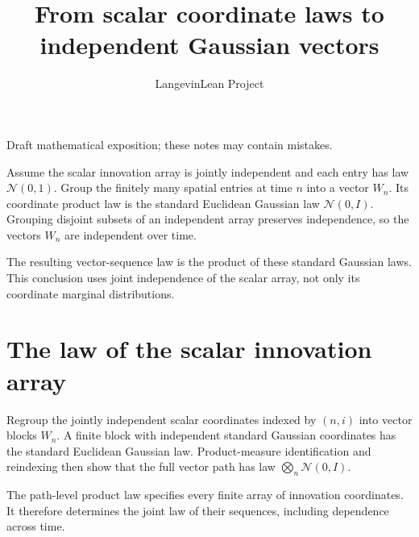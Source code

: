 \documentclass[11pt,a4paper]{article}
\title{\texorpdfstring{From scalar coordinate laws to independent Gaussian vectors}{From scalar coordinate laws to independent Gaussian vectors}}
\author{LangevinLean Project}
\date{}
\begin{document}
\maketitle
Draft mathematical exposition; these notes may contain mistakes.


Assume the scalar innovation array is jointly independent and each entry has law \(\mathcal N(0,1)\). Group the finitely many spatial entries at time \(n\) into a vector \(W_n\). Its coordinate product law is the standard Euclidean Gaussian law \(\mathcal N(0,I)\). Grouping disjoint subsets of an independent array preserves independence, so the vectors \(W_n\) are independent over time.



The resulting vector-sequence law is the product of these standard Gaussian laws. This conclusion uses joint independence of the scalar array, not only its coordinate marginal distributions.


\section{\texorpdfstring{The law of the scalar innovation array}{The law of the scalar innovation array}}


Regroup the jointly independent scalar coordinates indexed by \((n,i)\) into vector blocks \(W_n\). A finite block with independent standard Gaussian coordinates has the standard Euclidean Gaussian law. Product-measure identification and reindexing then show that the full vector path has law \(\bigotimes_n\mathcal N(0,I)\).



The path-level product law specifies every finite array of innovation coordinates. It therefore determines the joint law of their sequences, including dependence across time.
\end{document}
